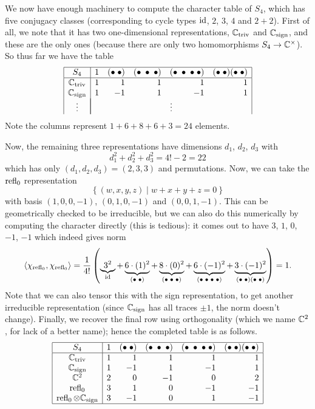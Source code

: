 \begin{example}
	We now have enough machinery to compute the character
	table of $S_4$, which has five conjugacy classes
	(corresponding to cycle types $\mathrm{id}$, $2$, $3$, $4$ and $2+2$).
	First of all, we note that it has two one-dimensional representations,
	$\mathbb C_{\mathrm{triv}}$ and $\mathbb C_{\mathrm{sign}}$, and these are the only ones
	(because there are only two homomorphisms $S_4 \to \mathbb C^\times$).
	So thus far we have the table
	\[
		\begin{array}{|c|rrrrr|}
			\hline
			S_4 & 1 & (\bullet\;\bullet) & (\bullet\;\bullet\;\bullet)
				& (\bullet\;\bullet\;\bullet\;\bullet)
				& (\bullet\;\bullet)(\bullet\;\bullet)
				\\ \hline
			\Ctriv & 1 & 1 & 1 & 1 & 1 \\
			\Csign & 1 & -1 & 1 & -1 & 1 \\
			\vdots & \multicolumn{5}{|c|}{\vdots}
		\end{array}
	\]
	Note the columns represent $1+6+8+6+3=24$ elements.

	Now, the remaining three representations have dimensions
	$d_1$, $d_2$, $d_3$ with
	\[ d_1^2 + d_2^2 + d_3^2 = 4! - 2 = 22 \]
	which has only $(d_1, d_2, d_3) = (2,3,3)$ and permutations.
	Now, we can take the $\operatorname{refl}_0$ representation
	\[ \left\{ (w,x,y,z) \mid w+x+y+z=0 \right\} \]
	with basis $(1,0,0,-1)$, $(0,1,0,-1)$ and $(0,0,1,-1)$.
	This can be geometrically checked to be irreducible,
	but we can also do this numerically by computing the
	character directly (this is tedious):
	it comes out to have $3$, $1$, $0$, $-1$, $-1$
	which indeed gives norm
	\[
		\left< \chi_{\operatorname{refl}_0}, \chi_{\operatorname{refl}_0} \right>
		=
		\frac{1}{4!}
		\left(
			\underbrace{3^2}_{\mathrm{id}}
			+ \underbrace{6\cdot(1)^2}_{(\bullet\;\bullet)}
			+ \underbrace{8\cdot(0)^2}_{(\bullet\;\bullet\;\bullet)}
			+ \underbrace{6\cdot(-1)^2}_{(\bullet\;\bullet\;\bullet\;\bullet)}
			+ \underbrace{3\cdot(-1)^2}_{(\bullet\;\bullet)(\bullet\;\bullet)}
		\right)
		= 1.
	\]
	Note that we can also tensor this with the sign representation,
	to get another irreducible representation
	(since $\mathbb C_{\mathrm{sign}}$ has all traces $\pm 1$, the norm doesn't change).
	Finally, we recover the final row using orthogonality
	(which we name $\mathbb C^2$, for lack of a better name);
	hence the completed table is as follows.
	\[
		\begin{array}{|c|rrrrr|}
			\hline
			S_4 & 1 & (\bullet\;\bullet) & (\bullet\;\bullet\;\bullet)
				& (\bullet\;\bullet\;\bullet\;\bullet)
				& (\bullet\;\bullet)(\bullet\;\bullet)
				\\ \hline
			\mathbb C_{\mathrm{triv}} & 1 & 1 & 1 & 1 & 1 \\
			\mathbb C_{\mathrm{sign}} & 1 & -1 & 1 & -1 & 1 \\
			\mathbb C^2 & 2 & 0 & -1 & 0 & 2 \\
			\operatorname{refl}_0 & 3 & 1 & 0 & -1 & -1 \\
			\operatorname{refl}_0 \otimes \mathbb C_{\mathrm{sign}} & 3 & -1 & 0 & 1 & -1 \\\hline
		\end{array}
	\]
\end{example}

